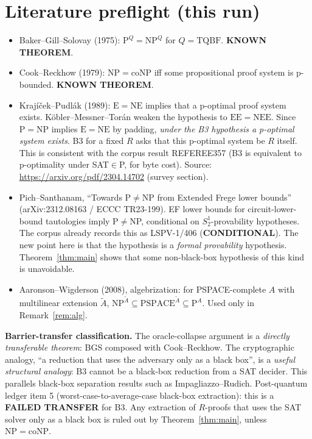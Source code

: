 \documentclass[11pt]{article}
\begin{document}
\section{Literature preflight (this run)}
\begin{itemize}
\item Baker--Gill--Solovay (1975): $\mathrm P^{Q}=\mathrm{NP}^{Q}$ for $Q=\mathrm{TQBF}$. \textbf{KNOWN THEOREM}.
\item Cook--Reckhow (1979): $\mathrm{NP}=\mathrm{coNP}$ iff some propositional proof system is p-bounded. \textbf{KNOWN THEOREM}.
\item Krajíček--Pudlák (1989): $\mathrm E=\mathrm{NE}$ implies that a p-optimal proof system exists. Köbler--Messner--Torán weaken the hypothesis to $\mathrm{EE}=\mathrm{NEE}$. Since $\mathrm P=\mathrm{NP}$ implies $\mathrm E=\mathrm{NE}$ by padding, \emph{under the B3 hypothesis a p-optimal system exists}. B3 for a fixed $R$ asks that this p-optimal system be $R$ itself. This is consistent with the corpus result REFEREE357 (B3 is equivalent to p-optimality under SAT$\in$P, for byte cost). Source: \url{https://arxiv.org/pdf/2304.14702} (survey section).
\item Pich--Santhanam, ``Towards P$\neq$NP from Extended Frege lower bounds'' (arXiv:2312.08163 / ECCC TR23-199). EF lower bounds for circuit-lower-bound tautologies imply P$\neq$NP, conditional on $S^1_2$-provability hypotheses. The corpus already records this as LSPV-1/406 (\textbf{CONDITIONAL}). The new point here is that the hypothesis is a \emph{formal provability} hypothesis. Theorem~\ref{thm:main} shows that some non-black-box hypothesis of this kind is unavoidable.
\item Aaronson--Wigderson (2008), algebrization: for PSPACE-complete $A$ with multilinear extension $\tilde A$, $\mathrm{NP}^{\tilde A}\subseteq \mathrm{PSPACE}^{\tilde A}\subseteq\mathrm P^{A}$. Used only in Remark~\ref{rem:alg}.
\end{itemize}
\textbf{Barrier-transfer classification.} The oracle-collapse argument is a
\emph{directly transferable theorem}: BGS composed with Cook--Reckhow. The
cryptographic analogy, ``a reduction that uses the adversary only as a black box'',
is a \emph{useful structural analogy}: B3 cannot be a black-box reduction from a
SAT decider. This parallels black-box separation results such as Impagliazzo--Rudich.
Post-quantum ledger item 5 (worst-case-to-average-case black-box extraction): this is a
\textbf{FAILED TRANSFER} for B3. Any extraction of $R$-proofs that uses the SAT solver
only as a black box is ruled out by Theorem~\ref{thm:main}, unless $\mathrm{NP}=\mathrm{coNP}$.
\end{document}
